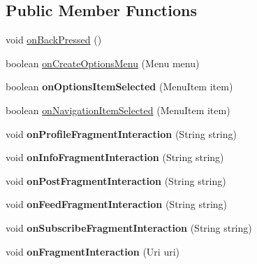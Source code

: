 \subsection*{Public Member Functions}
\begin{DoxyCompactItemize}
\item 
void \hyperlink{classcom_1_1example_1_1sel_1_1lostfound_1_1FeedActivity_a92ef1347dacbec013be0cc6eaf19e680}{on\-Back\-Pressed} ()
\item 
boolean \hyperlink{classcom_1_1example_1_1sel_1_1lostfound_1_1FeedActivity_a11b2b6ec46e07d2248259b101dd4f699}{on\-Create\-Options\-Menu} (Menu menu)
\item 
\hypertarget{classcom_1_1example_1_1sel_1_1lostfound_1_1FeedActivity_a30ac1d8cd6a1f8f4a17546f894ee0150}{boolean {\bfseries on\-Options\-Item\-Selected} (Menu\-Item item)}\label{classcom_1_1example_1_1sel_1_1lostfound_1_1FeedActivity_a30ac1d8cd6a1f8f4a17546f894ee0150}

\item 
boolean \hyperlink{classcom_1_1example_1_1sel_1_1lostfound_1_1FeedActivity_ac1e5f59e54f8b0adfcfcd7999c7d5d3d}{on\-Navigation\-Item\-Selected} (Menu\-Item item)
\item 
\hypertarget{classcom_1_1example_1_1sel_1_1lostfound_1_1FeedActivity_a7dab67bae2a8451acea819995f6e10b8}{void {\bfseries on\-Profile\-Fragment\-Interaction} (String string)}\label{classcom_1_1example_1_1sel_1_1lostfound_1_1FeedActivity_a7dab67bae2a8451acea819995f6e10b8}

\item 
\hypertarget{classcom_1_1example_1_1sel_1_1lostfound_1_1FeedActivity_a4d16fc6e0aa78d30aa10142e5e2584ac}{void {\bfseries on\-Info\-Fragment\-Interaction} (String string)}\label{classcom_1_1example_1_1sel_1_1lostfound_1_1FeedActivity_a4d16fc6e0aa78d30aa10142e5e2584ac}

\item 
\hypertarget{classcom_1_1example_1_1sel_1_1lostfound_1_1FeedActivity_a93cd51363a21d0dd0368eca17f91aa31}{void {\bfseries on\-Post\-Fragment\-Interaction} (String string)}\label{classcom_1_1example_1_1sel_1_1lostfound_1_1FeedActivity_a93cd51363a21d0dd0368eca17f91aa31}

\item 
\hypertarget{classcom_1_1example_1_1sel_1_1lostfound_1_1FeedActivity_a387420f45593f43ed8a998fabd4e1840}{void {\bfseries on\-Feed\-Fragment\-Interaction} (String string)}\label{classcom_1_1example_1_1sel_1_1lostfound_1_1FeedActivity_a387420f45593f43ed8a998fabd4e1840}

\item 
\hypertarget{classcom_1_1example_1_1sel_1_1lostfound_1_1FeedActivity_a2933085fa5342bd11b601c37120d850e}{void {\bfseries on\-Subscribe\-Fragment\-Interaction} (String string)}\label{classcom_1_1example_1_1sel_1_1lostfound_1_1FeedActivity_a2933085fa5342bd11b601c37120d850e}

\item 
\hypertarget{classcom_1_1example_1_1sel_1_1lostfound_1_1FeedActivity_a15280442a0b2314b06299d1d57318827}{void {\bfseries on\-Fragment\-Interaction} (Uri uri)}\label{classcom_1_1example_1_1sel_1_1lostfound_1_1FeedActivity_a15280442a0b2314b06299d1d57318827}

\end{DoxyCompactItemize}
